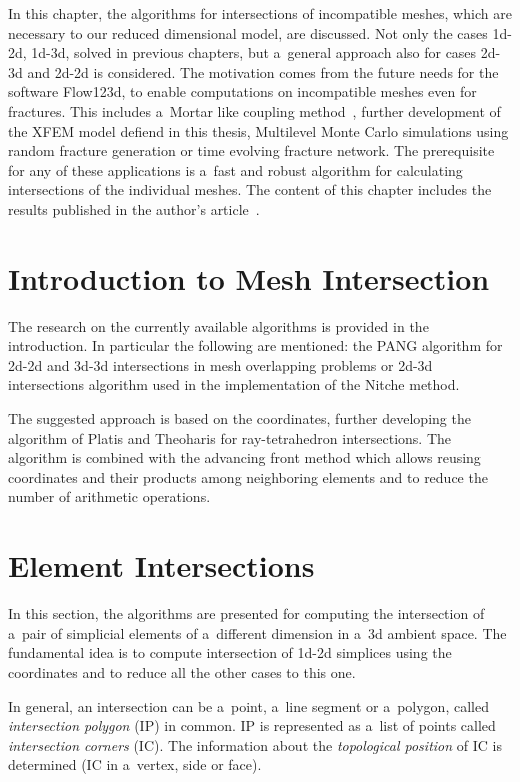 
In this chapter, the algorithms for intersections of incompatible meshes, which are necessary to our reduced dimensional model, are discussed.
Not only the cases 1d-2d, 1d-3d, solved in previous chapters, but a~general approach also for cases 2d-3d and 2d-2d is considered.
The motivation comes from the future needs for the software Flow123d, to enable computations on incompatible meshes even for fractures.
This includes a~Mortar like coupling method~\cite{brezina_2012}, further development of the XFEM model defiend in this thesis,
Multilevel Monte Carlo \cite{giles_mlmc_2015} simulations using random fracture generation or time evolving fracture network.
The prerequisite for any of these applications is a~fast and robust algorithm for calculating intersections of the individual meshes.
The content of this chapter includes the results published in the author's article~\cite{brezina_2017}.


\section{Introduction to Mesh Intersection}

The research on the currently available algorithms is provided in the introduction.
In particular the following are mentioned: the PANG algorithm \cite{gander_algorithm_2013} for 2d-2d and 3d-3d intersections in mesh overlapping problems or
2d-3d intersections algorithm \cite{massing_efficient_2013} used in the implementation of the Nitche method.

The suggested approach is based on the \plucker coordinates, further developing the algorithm of Platis and Theoharis \cite{platis_fast_2003}
for ray-tetrahedron intersections. The algorithm is combined with the advancing front method which allows reusing \plucker coordinates
and their products among neighboring elements and to reduce the number of arithmetic operations. 

\section{Element Intersections}
\label{sec:element intersecitons}
In this section, the algorithms are presented for computing the intersection of a~pair of simplicial elements
of a~different dimension in a~3d ambient space. The fundamental idea is to compute intersection of 1d-2d 
simplices using the \plucker coordinates and to reduce all the other cases to this one. 

In general, an intersection can be a~point, a~line segment or a~polygon, called \emph{intersection polygon} (IP) in common.
IP is represented as a~list of points called \emph{intersection corners} (IC).
The information about the \emph{topological position} of IC is determined (IC in a~vertex, side or face).

